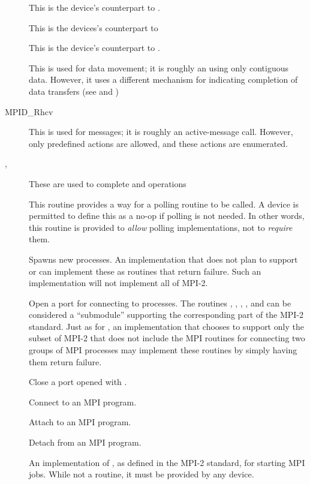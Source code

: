 \documentclass{article}
\begin{document}
\begin{description}
\item[]This is the device's counterpart to
. 
\item[]This is the devices's counterpart to
\item[]This is the device's counterpart to .
\item[]This is used for data movement; it is roughly an
 using only contiguous data.  However, it uses a
different mechanism for indicating completion of data transfers (see  and )
\item[MPID_Rhcv]This is used for messages; it is roughly an
active-message call.  However, only predefined actions are allowed,
and these actions are enumerated.
\item[, ]These are used to
  complete  
and  operations
\item[]This routine provides a way for a polling routine to
be called.  A device is permitted to define this as a no-op if polling
is not needed.  In other words, this routine is provided to
\emph{allow} polling implementations, not to \emph{require} them.
\item[]Spawns new processes.  An implementation
  that does not plan to support  or
   can implement these as routines that return
  failure.  Such an implementation will not implement all of MPI-2.
\item[]Open a port for connecting to processes.  The
  routines , ,
  , , and
   can be considered a 
  ``submodule'' supporting the corresponding part of the MPI-2 standard.  Just
  as for , an implementation that chooses to
  support only the subset of MPI-2 that does not include the MPI routines for
  connecting two groups of MPI processes may implement these routines by
  simply having them return failure.
\item[]Close a port opened with .
\item[]Connect to an MPI program.
\item[]Attach to an MPI program.
\item[]Detach from an MPI program.
\item[]An implementation of , as defined in the
  MPI-2 standard, for starting MPI jobs.  While not a routine, it must be 
  provided by any device.  
\end{description}
\end{document}
